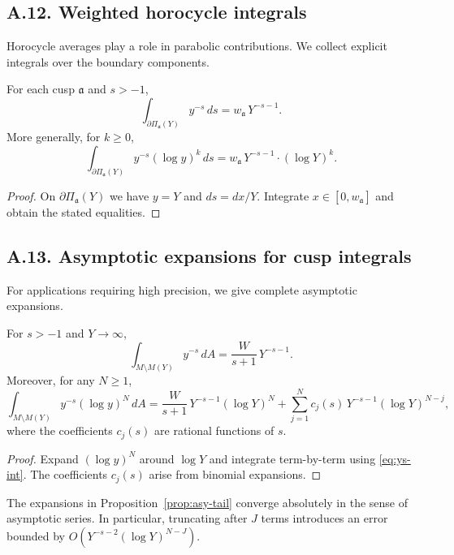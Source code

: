 \subsection*{A.12. Weighted horocycle integrals}

\noindent
Horocycle averages play a role in parabolic contributions. We collect explicit
integrals over the boundary components.

\begin{lemma}\label{lem:horo-av}
For each cusp $\mathfrak a$ and $s>-1$,
\[
\int_{\partial\Pi_{\mathfrak a}(Y)} y^{-s}\,ds = w_{\mathfrak a}\,Y^{-s-1}.
\]
More generally, for $k\ge 0$,
\[
\int_{\partial\Pi_{\mathfrak a}(Y)} y^{-s}(\log y)^k\,ds
= w_{\mathfrak a}\,Y^{-s-1}\cdot(\log Y)^k.
\]
\end{lemma}

\begin{proof}
On $\partial\Pi_{\mathfrak a}(Y)$ we have $y=Y$ and $ds=dx/Y$. Integrate
$x\in[0,w_{\mathfrak a}]$ and obtain the stated equalities.
\end{proof}


\subsection*{A.13. Asymptotic expansions for cusp integrals}

\noindent
For applications requiring high precision, we give complete asymptotic expansions.

\begin{proposition}\label{prop:asy-tail}
For $s>-1$ and $Y\to\infty$,
\[
\int_{M\setminus M(Y)} y^{-s}\,dA
=\frac{W}{s+1}\,Y^{-s-1}.
\]
Moreover, for any $N\ge 1$,
\[
\int_{M\setminus M(Y)} y^{-s}(\log y)^N\,dA
=\frac{W}{s+1}\,Y^{-s-1}(\log Y)^N
+ \sum_{j=1}^{N} c_j(s)\,Y^{-s-1}(\log Y)^{N-j},
\]
where the coefficients $c_j(s)$ are rational functions of $s$.
\end{proposition}

\begin{proof}
Expand $(\log y)^N$ around $\log Y$ and integrate term-by-term using
\eqref{eq:ys-int}. The coefficients $c_j(s)$ arise from binomial expansions.
\end{proof}

\begin{corollary}\label{cor:stability-exp}
The expansions in Proposition~\ref{prop:asy-tail} converge absolutely in the
sense of asymptotic series. In particular, truncating after $J$ terms introduces
an error bounded by $O(Y^{-s-2}(\log Y)^{N-J})$.
\end{corollary}

